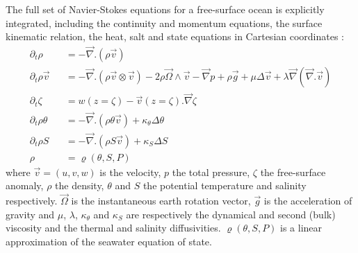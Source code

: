 \indent The full set of Navier-Stokes equations for a free-surface ocean is explicitly integrated, including the continuity and momentum equations, the surface kinematic relation, the heat, salt and state equations in Cartesian coordinates : 
\begin{eqnarray}
   \partial_t\rho &&=-\vec{\nabla}.(\rho\vec{v})\\[3mm]
   \label{momentum}
   \partial_t\rho\vec{v} &&=
   -\vec{\nabla}.\left(\rho\vec{v}\otimes\vec{v}\right)
   -2\rho\vec{\Omega}\wedge\vec{v}
   -\vec\nabla p+\rho\vec{g}
   +\mu\Delta\vec{v}
   +\lambda\vec{\nabla}(\vec{\nabla}.\vec{v})\\[3mm]
   \partial_t{\zeta} &&= 
   w\scriptstyle(z=\zeta)\textstyle
   -\vec{v}\scriptstyle(z=\zeta)\textstyle.\vec{\nabla}{\zeta}\\[3mm]
   \partial_t{\rho\theta} &&=-\vec{\nabla}.\left(\rho\theta\vec{v}\right)
   +\kappa_{\theta}\Delta\theta\\[3mm]
   \partial_t{\rho S} &&=-\vec{\nabla}.\left(\rho S\vec{v}\right)
   +\kappa_{S}\Delta S\\[3mm]
   \rho &&=\varrho\left(\theta,S,P\right)
\end{eqnarray}
where $\vec{v}=(u,v,w)$ is the velocity, $p$ the total pressure, $\zeta$ the free-surface anomaly, $\rho$ the density, $\theta$ and $S$ the potential temperature and salinity respectively. $\vec{\Omega}$ is the instantaneous earth rotation vector, $\vec{g}$ is the acceleration of gravity and $\mu$, $\lambda$, $\kappa_{\theta}$ and $\kappa_{S}$ are respectively the dynamical and second (bulk) viscosity and the thermal and salinity diffusivities. $\varrho\left(\theta,S,P\right)$ is a linear approximation of the seawater equation of state. 

   
